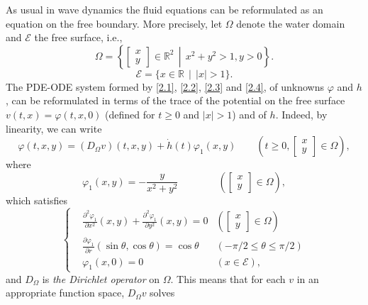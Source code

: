\documentclass{amsart} %
\numberwithin{equation}{section}
\theoremstyle{definition}
\begin{document}
As usual in wave dynamics the fluid equations can be reformulated as an equation on the free boundary. More precisely, let $\Omega$ denote the water domain and $\mathcal{E}$ the free surface, i.e.,
\begin{equation}\label{Omega}
    \Omega=\left\{\left.\begin{bmatrix} x\\ y\end{bmatrix}\in \mathbb{R}^2\ \ \right|\ \ x^2+y^2>1,y>0\right\}.
\end{equation}
\begin{equation}\label{Mathcal_E}
    \mathcal{E}=\{x\in\mathbb{R} \ \ | \ \ |x|>1\}.
\end{equation}
The PDE-ODE system formed by \eqref{2.1}, \eqref{2.2}, \eqref{2.3} and \eqref{2.4}, of unknowns $\varphi$ and $h$, can be reformulated in terms of the trace of the potential on the free surface $v(t,x)=\varphi(t,x,0)$ (defined for $t\geqslant 0$ and $|x|>1$) and of $h$. Indeed, by linearity, we can write
\begin{equation}\label{dec_phi}
    \varphi(t,x,y)=(D_{\Omega}v)(t,x,y)+\dot{h}(t)\varphi_1(x,y)\qquad\left(t\geqslant 0, \begin{bmatrix}x\\y\end{bmatrix}\in\Omega\right),
\end{equation}
where
\begin{equation}
    \varphi_1(x,y)=-\frac{y}{x^2+y^2}\qquad\qquad \left(\begin{bmatrix}x\\y\end{bmatrix}\in\Omega\right),
\end{equation}
which satisfies
\begin{equation}
\left\{
\begin{aligned}
 &\frac{\partial^2\varphi_1}{\partial x^2}(x,y)+\frac{\partial^2\varphi_1}{\partial y^2}(x,y)=0 &\left(\begin{bmatrix}x\\y\end{bmatrix}\in\Omega\right)\\
 &\frac{\partial\varphi_1}{\partial r}(\sin\theta,\cos\theta)=\cos\theta &(-\pi/2\leqslant\theta\leqslant\pi/2)\\
 &\varphi_1(x,0)=0 & (x\in\mathcal{E}),
\end{aligned}
\right.
\end{equation}
and $D_\Omega$ is {\em the Dirichlet operator} on $\Omega$. This means that for each $v$ in an appropriate function space, $D_{\Omega}v$ solves
\end{document}

